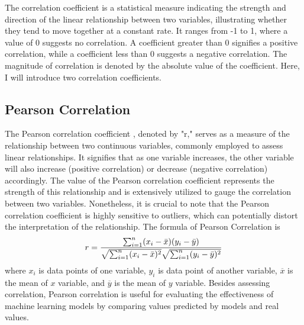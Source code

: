 \documentclass[12pt,a4paper,english
]{tunithesis}
\begin{document}
The correlation coefficient is a statistical measure indicating the strength and direction of the linear relationship between two variables, illustrating whether they tend to move together at a constant rate. It ranges from -1 to 1, where a value of 0 suggests no correlation. A coefficient greater than 0 signifies a positive correlation, while a coefficient less than 0 suggests a negative correlation. The magnitude of correlation is denoted by the absolute value of the coefficient. Here, I will introduce two correlation coefficients. \parencite{acuk2023, Schober2018}

\subsection{Pearson Correlation}
The Pearson correlation coefficient \parencite{acuk2023, Schober2018}, denoted by "r," serves as a measure of the relationship between two continuous variables, commonly employed to assess linear relationships. It signifies that as one variable increases, the other variable will also increase (positive correlation) or decrease (negative correlation) accordingly. The value of the Pearson correlation coefficient represents the strength of this relationship and is extensively utilized to gauge the correlation between two variables. Nonetheless, it is crucial to note that the Pearson correlation coefficient is highly sensitive to outliers, which can potentially distort the interpretation of the relationship. The formula of Pearson Correlation is
\begin{equation}
  r =
  \frac{ \sum_{i=1}^{n}(x_i-\bar{x})(y_i-\bar{y}) }{%
        \sqrt{\sum_{i=1}^{n}(x_i-\bar{x})^2}\sqrt{\sum_{i=1}^{n}(y_i-\bar{y})^2}}
\end{equation}
where $x_i$ is data points of one variable, $y_i$ is data point of another variable, $\overline{x}$ is the mean of $x$ variable, and $\overline{y}$ is the mean of $y$ variable. Besides assessing correlation, Pearson correlation is useful for evaluating the effectiveness of machine learning models by comparing values predicted by models and real values. \parencite{kirk2021} 
\end{document}
